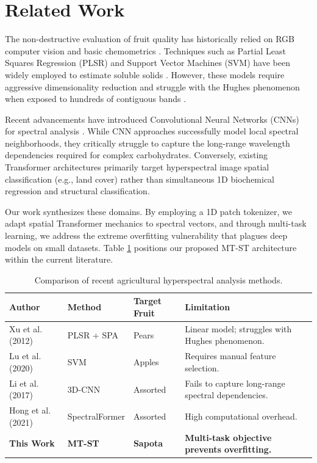 \documentclass[pdflatex,sn-mathphys-num]{sn-jnl}
\begin{document}
\section{Related Work}\label{sec:related_work}

The non-destructive evaluation of fruit quality has historically relied on RGB computer vision and basic chemometrics \cite{lu2013detection, schmilovitch2000determination}. Techniques such as Partial Least Squares Regression (PLSR) and Support Vector Machines (SVM) have been widely employed to estimate soluble solids \cite{shao2007visible, eisenstecken2015near}. However, these models require aggressive dimensionality reduction and struggle with the Hughes phenomenon when exposed to hundreds of contiguous bands \cite{xiao2020recent}.

Recent advancements have introduced Convolutional Neural Networks (CNNs) for spectral analysis \cite{tian2007measurement, magwaza2012nir, li2017spectral, he2016deep}. While CNN approaches successfully model local spectral neighborhoods, they critically struggle to capture the long-range wavelength dependencies required for complex carbohydrates. Conversely, existing Transformer architectures \cite{hong2021spectralformer} primarily target hyperspectral image spatial classification (e.g., land cover) rather than simultaneous 1D biochemical regression and structural classification. 

Our work synthesizes these domains. By employing a 1D patch tokenizer, we adapt spatial Transformer mechanics to spectral vectors, and through multi-task learning, we address the extreme overfitting vulnerability that plagues deep models on small datasets. Table \ref{tab:related_work} positions our proposed MT-ST architecture within the current literature.

\begin{table}[ht]
\centering
\caption{Comparison of recent agricultural hyperspectral analysis methods.}\label{tab:related_work}
\begin{tabular}{@{}llll@{}}
\toprule
\textbf{Author} & \textbf{Method} & \textbf{Target Fruit} & \textbf{Limitation} \\
\midrule
Xu et al. (2012) & PLSR + SPA & Pears & Linear model; struggles with Hughes phenomenon. \\
Lu et al. (2020) & SVM & Apples & Requires manual feature selection. \\
Li et al. (2017) & 3D-CNN & Assorted & Fails to capture long-range spectral dependencies. \\
Hong et al. (2021) & SpectralFormer & Assorted & High computational overhead. \\
\textbf{This Work} & \textbf{MT-ST} & \textbf{Sapota} & \textbf{Multi-task objective prevents overfitting.} \\
\bottomrule
\end{tabular}
\end{table}
\end{document}
